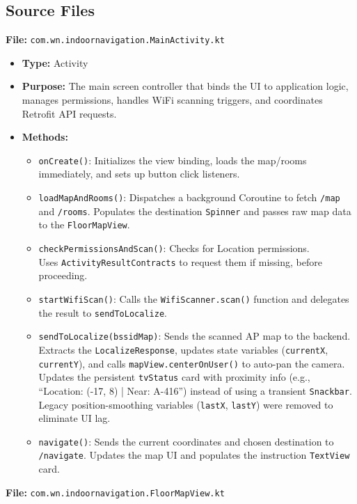 \documentclass[11pt,a4paper]{article}
\begin{document}
\subsection{Source Files}
\textbf{File:} \texttt{com.wn.indoornavigation.MainActivity.kt}
\begin{itemize}
\item \textbf{Type:} Activity
\item \textbf{Purpose:} The main screen controller that binds the UI to application logic, manages permissions, handles WiFi scanning triggers, and coordinates Retrofit API requests.
\item \textbf{Methods:}
\begin{itemize}
\item \texttt{onCreate()}: Initializes the view binding, loads the map/rooms immediately, and sets up button click listeners.
\item \texttt{loadMapAndRooms()}: Dispatches a background Coroutine to fetch \texttt{/map} and \texttt{/rooms}. Populates the destination \texttt{Spinner} and passes raw map data to the \texttt{FloorMapView}.
\item \texttt{checkPermissionsAndScan()}: Checks for Location permissions. \\ Uses \texttt{ActivityResultContracts} to request them if missing, before proceeding.
\item \texttt{startWifiScan()}: Calls the \texttt{WifiScanner.scan()} function and delegates the result to \texttt{sendToLocalize}.
\item \texttt{sendToLocalize(bssidMap)}: Sends the scanned AP map to the backend. Extracts the \texttt{LocalizeResponse}, updates state variables (\texttt{currentX}, \texttt{currentY}), and calls \texttt{mapView.centerOnUser()} to auto-pan the camera. Updates the persistent \texttt{tvStatus} card with proximity info (e.g., ``Location: (-17, 8) | Near: A-416'') instead of using a transient \texttt{Snackbar}. Legacy position-smoothing variables (\texttt{lastX}, \texttt{lastY}) were removed to eliminate UI lag.
\item \texttt{navigate()}: Sends the current coordinates and chosen destination to \texttt{/navigate}. Updates the map UI and populates the instruction \texttt{TextView} card.
\end{itemize}
\end{itemize}
\textbf{File:} \texttt{com.wn.indoornavigation.FloorMapView.kt}
\end{document}
